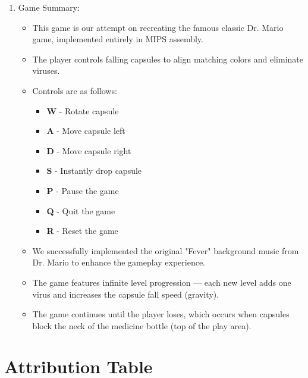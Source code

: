 \documentclass{article}
\begin{document}
\begin{enumerate}
\item Game Summary:
\begin{itemize}
    \item This game is our attempt on recreating the famous classic Dr. Mario game, implemented entirely in MIPS assembly.
    \item The player controls falling capsules to align matching colors and eliminate viruses.
    \item Controls are as follows:
    \begin{itemize}
        \item \textbf{W} - Rotate capsule
        \item \textbf{A} - Move capsule left
        \item \textbf{D} - Move capsule right
        \item \textbf{S} - Instantly drop capsule
        \item \textbf{P} - Pause the game
        \item \textbf{Q} - Quit the game
        \item \textbf{R} - Reset the game
    \end{itemize}
    \item We successfully implemented the original "Fever" background music from Dr. Mario to enhance the gameplay experience.
    \item The game features infinite level progression — each new level adds one virus and increases the capsule fall speed (gravity).
    \item The game continues until the player loses, which occurs when capsules block the neck of the medicine bottle (top of the play area).
\end{itemize}

    
\end{enumerate}

\section{Attribution Table}
\end{document}
